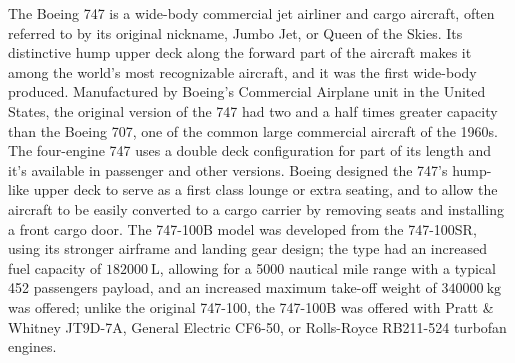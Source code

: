 \bigskip
\noindent
The Boeing 747 is a wide-body commercial jet airliner and cargo aircraft, often referred to by its original nickname, Jumbo Jet, or Queen of the Skies. Its distinctive hump upper deck along the forward part of the aircraft makes it among the world's most recognizable aircraft, and it was the first wide-body produced. Manufactured by Boeing's Commercial Airplane unit in the United States, the original version of the 747 had two and a half times greater capacity than the Boeing 707, one of the common large commercial aircraft of the 1960s. The four-engine 747 uses a double deck configuration for part of its length and it’s available in passenger and other versions. Boeing designed the 747's hump-like upper deck to serve as a first class lounge or extra seating, and to allow the aircraft to be easily converted to a cargo carrier by removing seats and installing a front cargo door. The 747-100B model was developed from the 747-100SR, using its stronger airframe and landing gear design; the type had an increased fuel capacity of $\SI{182000}{\liter}$, allowing for a 5000 nautical mile range with a typical 452 passengers payload, and an increased maximum take-off weight of $\SI{340000}{\kilogram}$ was offered; unlike the original 747-100, the 747-100B was offered with Pratt \& Whitney JT9D-7A, General Electric CF6-50, or Rolls-Royce RB211-524 turbofan engines.

